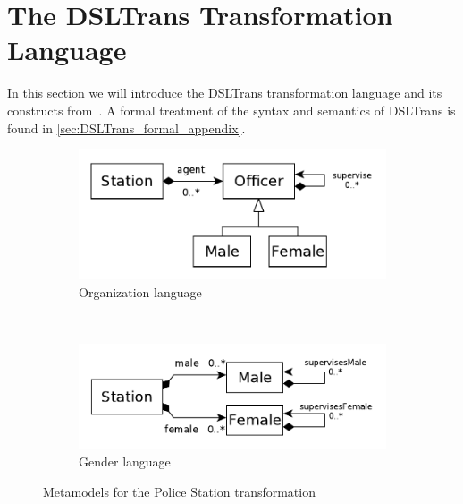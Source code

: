 \section{The DSLTrans Transformation Language}
\label{sec:dsltrans}

In this section we will introduce the DSLTrans transformation language and its
constructs from~\cite{DBLP:conf/sle/BarrocaLAFS10}. A formal treatment of the syntax and semantics of DSLTrans is found in \cref{sec:DSLTrans_formal_appendix}.



\begin{figure}[t]
        \centering
        \begin{subfigure}[b]{0.40\textwidth}
                \centering
                \includegraphics[width=1\textwidth]{./figures/policestation_dsltrans/organization.pdf}
                \caption{Organization language}
                \label{fig:OrganizationLanguage}
        \end{subfigure}%
        ~~
        \begin{subfigure}[b]{0.40\textwidth}
                \centering
                \includegraphics[width=1\textwidth]{./figures/policestation_dsltrans/gender.pdf}
                \caption{Gender language}
                \label{fig:GenderLanguage}
        \end{subfigure}%
        \caption{Metamodels for the Police Station transformation}
        \label{fig:squadmetamodel}
\end{figure}

